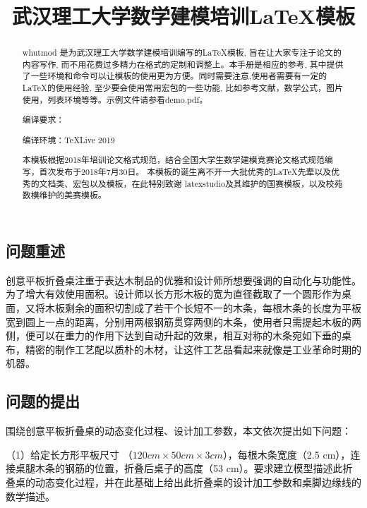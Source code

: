 \documentclass{whutmod}
\title{武汉理工大学数学建模培训\LaTeX 模板}
\begin{document}
\begin{spacing}{1.0}
\maketitle

\begin{abstract}
	whutmod 是为武汉理工大学数学建模培训编写的\LaTeX 模板, 旨在让大家专注于论文的内容写作, 而不用花费过多精力在格式的定制和调整上。本手册是相应的参考, 其中提供了一些环境和命令可以让模板的使用更为方便。同时需要注意,使用者需要有一定的\LaTeX 的使用经验, 至少要会使用常用宏包的一些功能, 比如参考文献，数学公式，图片使用，列表环境等等。示例文件请参看demo.pdf。
	
	编译要求：\XeLaTeX
	
	编译环境：\TeX Live 2019
	
	本模板根据2018年培训论文格式规范，结合全国大学生数学建模竞赛论文格式规范编写，首次发布于2018年7月30日。
	本模板的诞生离不开一大批优秀的\LaTeX 先辈以及优秀的文档类、宏包以及模板，在此特别致谢 latexstudio及其维护的国赛模板，以及校苑数模维护的美赛模板。
	
\end{abstract}

\tableofcontents
\newpage

\section{问题重述}

创意平板折叠桌注重于表达木制品的优雅和设计师所想要强调的自动化与功能性。为了增大有效使用面积。设计师以长方形木板的宽为直径截取了一个圆形作为桌面，又将木板剩余的面积切割成了若干个长短不一的木条，每根木条的长度为平板宽到圆上一点的距离，分别用两根钢筋贯穿两侧的木条，使用者只需提起木板的两侧，便可以在重力的作用下达到自动升起的效果，相互对称的木条宛如下垂的桌布，精密的制作工艺配以质朴的木材，让这件工艺品看起来就像是工业革命时期的机器。

\subsection{问题的提出}

围绕创意平板折叠桌的动态变化过程、设计加工参数，本文依次提出如下问题：

（1）给定长方形平板尺寸 （$120 cm \times 50 cm \times 3 cm$），每根木条宽度（2.5 cm），连接桌腿木条的钢筋的位置，折叠后桌子的高度（53 cm）。要求建立模型描述此折叠桌的动态变化过程，并在此基础上给出此折叠桌的设计加工参数和桌脚边缘线的数学描述。


\end{spacing}
\end{document}
